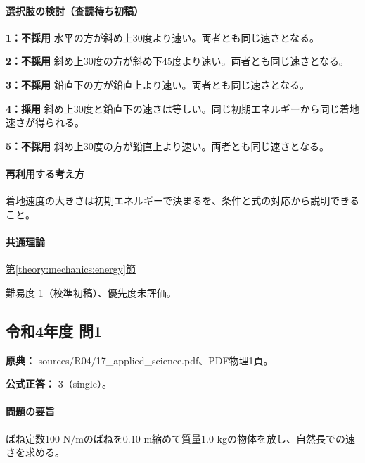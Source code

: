 \paragraph{選択肢の検討（査読待ち初稿）}\mbox{}\par

\noindent\textbf{1：不採用} 水平の方が斜め上30度より速い。両者とも同じ速さとなる。\par

\noindent\textbf{2：不採用} 斜め上30度の方が斜め下45度より速い。両者とも同じ速さとなる。\par

\noindent\textbf{3：不採用} 鉛直下の方が鉛直上より速い。両者とも同じ速さとなる。\par

\noindent\textbf{4：採用} 斜め上30度と鉛直下の速さは等しい。同じ初期エネルギーから同じ着地速さが得られる。\par

\noindent\textbf{5：不採用} 斜め上30度の方が鉛直上より速い。両者とも同じ速さとなる。\par

\paragraph{再利用する考え方} 着地速度の大きさは初期エネルギーで決まるを、条件と式の対応から説明できること。

\paragraph{共通理論} \hyperref[theory:mechanics:energy]{第\ref*{theory:mechanics:energy}節}

\par 難易度 1（校準初稿）、優先度未評価。

\subsection{令和4年度 問1}
\label{q:r04-reg-applied-01}

\noindent\textbf{原典：} sources/R04/17\_applied\_science.pdf、PDF物理1頁。

\textbf{公式正答：} 3（single）。

\paragraph{問題の要旨} ばね定数100 N/mのばねを0.10 m縮めて質量1.0 kgの物体を放し、自然長での速さを求める。

